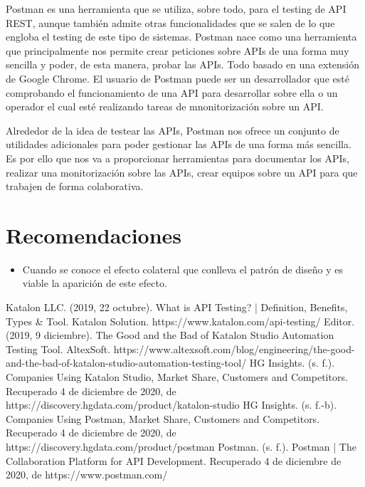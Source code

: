 \documentclass[twoside,twocolumn]{article}
\begin{document}
Postman es una herramienta que se utiliza, sobre todo, para el testing de API REST, aunque también admite otras funcionalidades que se salen de lo que engloba el testing de este tipo de sistemas. Postman nace como una herramienta que principalmente nos permite crear peticiones sobre APIs de una forma muy sencilla y poder, de esta manera, probar las APIs. Todo basado en una extensión de Google Chrome. El usuario de Postman puede ser un desarrollador que esté comprobando el funcionamiento de una API para desarrollar sobre ella o un operador el cual esté realizando tareas de mnonitorización sobre un API.

Alrededor de la idea de testear las APIs, Postman nos ofrece un conjunto de utilidades adicionales para poder gestionar las APIs de una forma más sencilla. Es por ello que nos va a proporcionar herramientas para documentar los APIs, realizar una monitorización sobre las APIs, crear equipos sobre un API para que trabajen de forma colaborativa.

\section{Recomendaciones}


\begin{itemize}
\item Cuando se conoce el efecto colateral que conlleva el patrón de diseño y es viable la aparición de este efecto.

\end{itemize}




\begin{thebibliography}{99} 

\bibitem[1]{}
\newblock Katalon LLC. (2019, 22 octubre). What is API Testing? | Definition, Benefits, Types \& Tool. Katalon Solution. https://www.katalon.com/api-testing/
\bibitem[2]{}
\newblock Editor. (2019, 9 diciembre). The Good and the Bad of Katalon Studio Automation Testing Tool. AltexSoft. https://www.altexsoft.com/blog/engineering/the-good-and-the-bad-of-katalon-studio-automation-testing-tool/
\bibitem[3]{}
\newblock HG Insights. (s. f.). Companies Using Katalon Studio, Market Share, Customers and Competitors. Recuperado 4 de diciembre de 2020, de https://discovery.hgdata.com/product/katalon-studio
\bibitem[4]{}
\newblock HG Insights. (s. f.-b). Companies Using Postman, Market Share, Customers and Competitors. Recuperado 4 de diciembre de 2020, de https://discovery.hgdata.com/product/postman
\bibitem[5]{}
\newblock Postman. (s. f.). Postman | The Collaboration Platform for API Development. Recuperado 4 de diciembre de 2020, de https://www.postman.com/
\end{thebibliography}


\end{document}
